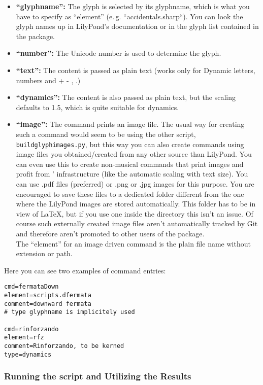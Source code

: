 \documentclass{article}
\begin{document}
\begin{itemize}
	\begin{itemize}
		\item \textbf{“glyphname”:} The glyph is selected by its glyphname, which is what you have to specify as “element” (e.\,g. “accidentals.sharp“).
		You can look the glyph names up in LilyPond's documentation or in the glyph list contained in the package.
		\item \textbf{“number”:} The Unicode number is used to determine the glyph.
		\item \textbf{“text”:} The content is passed as plain text (works only for Dynamic letters, numbers and + - , .)
		\item \textbf{“dynamics”:} The content is also passed as plain text, but the scaling defaults to 1.5, which is quite suitable for dynamics.
		\item \textbf{“image”:} The command prints an image file.
		The usual way for creating such a command would seem to be using the other script, \texttt{buildglyphimages.py}, but this way you can also create commands using image files you obtained/created from any other source than LilyPond.
		You can even use this to create non-musical commands that print images and profit from \lilyglyphs*' infrastructure (like the automatic scaling with text size).
		You can use .pdf files (preferred) or .png or .jpg images for this purpose.
		You are encouraged to save these files to a dedicated folder different from the one where the LilyPond images are stored automatically.
		This folder has to be in view of \LaTeX, but if you use one inside the \lilyglyphs directory this isn't an issue.
		Of course such externally created image files aren't automatically tracked by Git and therefore aren't promoted to other users of the package.\\
		The “element” for an image driven command is the plain file name without extension or path.
	\end{itemize}
\end{itemize}

\noindent Here you can see two examples of command entries:
\begin{verbatim}
cmd=fermataDown
element=scripts.dfermata
comment=downward fermata
# type glyphname is implicitely used

cmd=rinforzando
element=rfz
comment=Rinforzando, to be kerned
type=dynamics
\end{verbatim}

\subsubsection{Running the script and Utilizing the Results}
\label{subsubsec:GGC_running_utilizing}
\end{document}
